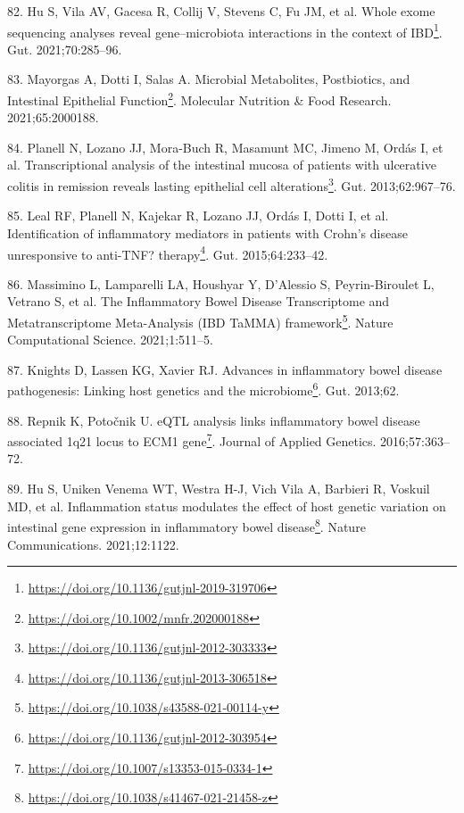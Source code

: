 \documentclass[
  12pt,
  a4paper,
  twoside,
  openright]{book}
\DeclareRobustCommand{\href}[2]{#2\footnote{\url{#1}}}
\newlength{\cslhangindent}
\newlength{\cslentryspacingunit} %
\newenvironment{CSLReferences}[2] %
 {%
  \setlength{\parindent}{0pt}
  \ifodd #1
  \let\oldpar\par
  \def\par{\hangindent=\cslhangindent\oldpar}
  \fi
  \setlength{\parskip}{#2\cslentryspacingunit}
 }%
 {}
\begin{document}
\begin{CSLReferences}{0}{0}
\leavevmode{}%
82. Hu S, Vila AV, Gacesa R, Collij V, Stevens C, Fu JM, et al. \href{https://doi.org/10.1136/gutjnl-2019-319706}{Whole exome sequencing analyses reveal gene--microbiota interactions in the context of IBD}. Gut. 2021;70:285--96.

\leavevmode{}%
83. Mayorgas A, Dotti I, Salas A. \href{https://doi.org/10.1002/mnfr.202000188}{Microbial Metabolites, Postbiotics, and Intestinal Epithelial Function}. Molecular Nutrition \& Food Research. 2021;65:2000188.

\leavevmode{}%
84. Planell N, Lozano JJ, Mora-Buch R, Masamunt MC, Jimeno M, Ordás I, et al. \href{https://doi.org/10.1136/gutjnl-2012-303333}{Transcriptional analysis of the intestinal mucosa of patients with ulcerative colitis in remission reveals lasting epithelial cell alterations}. Gut. 2013;62:967--76.

\leavevmode{}%
85. Leal RF, Planell N, Kajekar R, Lozano JJ, Ordás I, Dotti I, et al. \href{https://doi.org/10.1136/gutjnl-2013-306518}{Identification of inflammatory mediators in patients with Crohn's disease unresponsive to anti-TNF? therapy}. Gut. 2015;64:233--42.

\leavevmode{}%
86. Massimino L, Lamparelli LA, Houshyar Y, D'Alessio S, Peyrin-Biroulet L, Vetrano S, et al. \href{https://doi.org/10.1038/s43588-021-00114-y}{The Inflammatory Bowel Disease Transcriptome and Metatranscriptome Meta-Analysis (IBD TaMMA) framework}. Nature Computational Science. 2021;1:511--5.

\leavevmode{}%
87. Knights D, Lassen KG, Xavier RJ. \href{https://doi.org/10.1136/gutjnl-2012-303954}{Advances in inflammatory bowel disease pathogenesis: Linking host genetics and the microbiome}. Gut. 2013;62.

\leavevmode{}%
88. Repnik K, Potočnik U. \href{https://doi.org/10.1007/s13353-015-0334-1}{eQTL analysis links inflammatory bowel disease associated 1q21 locus to ECM1 gene}. Journal of Applied Genetics. 2016;57:363--72.

\leavevmode{}%
89. Hu S, Uniken Venema WT, Westra H-J, Vich Vila A, Barbieri R, Voskuil MD, et al. \href{https://doi.org/10.1038/s41467-021-21458-z}{Inflammation status modulates the effect of host genetic variation on intestinal gene expression in inflammatory bowel disease}. Nature Communications. 2021;12:1122.


\end{CSLReferences}
\end{document}
